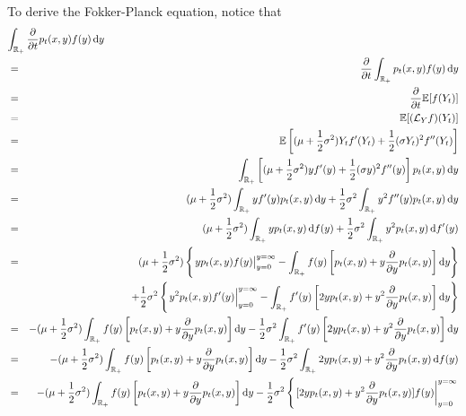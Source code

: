 \begin{enumerate}
        To derive the Fokker-Planck equation, notice that
        \begin{eqnarray*}
            \lefteqn{\int_{\mbb{R}_+} \frac{\partial}{\partial t} p_t(x,y) f(y) \dif y} \\ 
            & = & \frac{\partial}{\partial t} \int_{\mbb{R}_+} p_t(x,y) f(y) \dif y \\ 
            & = & \frac{\partial}{\partial t} \E [f(Y_t)] \\ 
            & = & \E [(\mathcal{L}_Y f)(Y_t)] \\ 
            & = & \E \left[(\mu + \frac{1}{2} \sigma^2)Y_t f'(Y_t) + \frac{1}{2} (\sigma Y_t)^2 f''(Y_t)\right] \\ 
            & = & \int_{\mbb{R}_+} \left[ (\mu+\frac{1}{2}\sigma^2) y f'(y) + \frac{1}{2} (\sigma y)^2 f''(y) \right] p_t(x,y) \dif y \\ 
            & = & (\mu + \frac{1}{2} \sigma^2) \int_{\mbb{R}_+} y f'(y) p_t(x, y) \dif y + \frac{1}{2}\sigma^2 \int_{\mbb{R}_+} y^2 f''(y) p_t(x, y) \dif y \\ 
            & = &(\mu + \frac{1}{2} \sigma^2) \int_{\mbb{R}_+} y p_t(x,y) \dif f(y) + \frac{1}{2} \sigma^2 \int_{\mbb{R}_+} y^2 p_t(x,y) \dif f'(y) \\ 
            & = & (\mu + \frac{1}{2}\sigma^2) \left\{ \left. yp_t(x,y)f(y) \right|_{y = 0}^{y = \infty} - \int_{\mbb{R}_+} f(y) \left[p_t(x,y)+ y \frac{\partial}{\partial y} p_t(x, y)\right] \dif y\right\} \\ 
            & & + \frac{1}{2}\sigma^2 \left\{ \left. y^2p_t(x,y)f'(y) \right|_{y = 0}^{y = \infty} - \int_{\mbb{R}_+} f'(y) \left[ 2y p_t(x,y) + y^2 \frac{\partial}{\partial y} p_t(x,y) \right] \dif y\right\} \\ 
            & = & - (\mu + \frac{1}{2}\sigma^2)  \int_{\mbb{R}_+} f(y) \left[p_t(x,y)+ y \frac{\partial}{\partial y} p_t(x, y)\right] \dif y - \frac{1}{2} \sigma^2 \int_{\mbb{R}_+} f'(y) \left[ 2y p_t(x,y) + y^2 \frac{\partial}{\partial y} p_t(x,y) \right] \dif y \\ 
            & = & - (\mu + \frac{1}{2}\sigma^2)  \int_{\mbb{R}_+} f(y) \left[p_t(x,y)+ y \frac{\partial}{\partial y} p_t(x, y)\right] \dif y -  \frac{1}{2} \sigma^2 \int_{\mbb{R}_+} 2y p_t(x,y) + y^2 \frac{\partial}{\partial y} p_t(x,y) \dif f(y) \\ 
            & = & - (\mu + \frac{1}{2}\sigma^2)  \int_{\mbb{R}_+} f(y) \left[p_t(x,y)+ y \frac{\partial}{\partial y} p_t(x, y)\right] \dif y - \frac{1}{2} \sigma^2 \left\{ \left. [2y p_t(x,y) + y^2 \frac{\partial}{\partial y} p_t(x,y)] f(y) \right|_{y = 0}^{y = \infty} \right. \\ 

\end{eqnarray*}
\end{enumerate}
